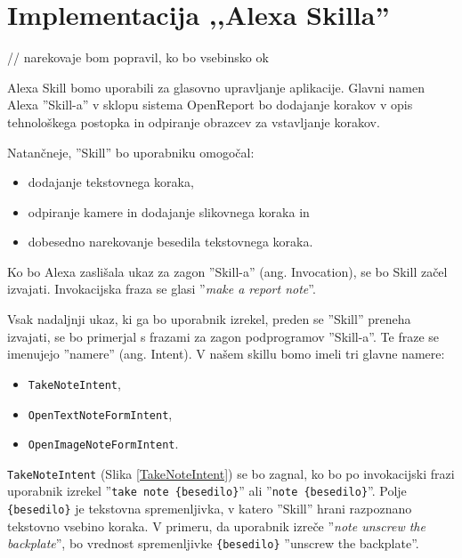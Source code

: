 \documentclass[a4paper, 12pt]{book}
\begin{document}
\section{Implementacija ,,Alexa Skilla''}

// narekovaje bom popravil, ko bo vsebinsko ok

Alexa Skill bomo uporabili za glasovno upravljanje aplikacije.
Glavni namen Alexa ''Skill-a'' v sklopu sistema OpenReport bo dodajanje korakov v opis tehnološkega postopka in odpiranje obrazcev za vstavljanje korakov.

\noindent Natančneje, ''Skill'' bo uporabniku omogočal:
\begin{itemize}
	\item dodajanje tekstovnega koraka,
	\item odpiranje kamere in dodajanje slikovnega koraka in
	\item dobesedno narekovanje besedila tekstovnega koraka.
\end{itemize}

Ko bo Alexa zaslišala ukaz za zagon ''Skill-a'' (ang. Invocation), se bo Skill začel izvajati.
Invokacijska fraza se glasi ''\textit{make a report note}''.

Vsak nadaljnji ukaz, ki ga bo uporabnik izrekel, preden se ''Skill'' preneha izvajati, se bo primerjal s frazami za zagon podprogramov ''Skill-a''.
Te fraze se imenujejo ''namere'' (ang. Intent).
V našem skillu bomo imeli tri glavne namere:

\begin{itemize}
	\item \texttt{TakeNoteIntent},
	\item \texttt{OpenTextNoteFormIntent},
	\item \texttt{OpenImageNoteFormIntent}.
\end{itemize}

\texttt{TakeNoteIntent} (Slika \ref{TakeNoteIntent}) se bo zagnal, ko bo po invokacijski frazi uporabnik izrekel ''\texttt{take note \{besedilo\}}'' ali ''\texttt{note \{besedilo\}}''.
Polje \texttt{\{besedilo\}} je tekstovna spremenljivka, v katero ''Skill'' hrani razpoznano tekstovno vsebino koraka.
V primeru, da uporabnik izreče ''\textit{note unscrew the backplate}'', bo vrednost spremenljivke \texttt{\{besedilo\}} ''unscrew the backplate''.
\end{document}
